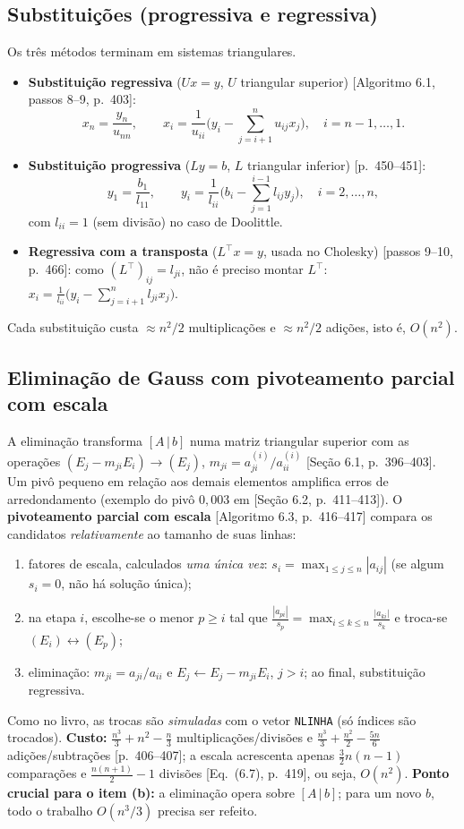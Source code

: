 \documentclass{article}
\newcommand{\T}{^{\top}}
\newcommand{\burden}[1]{\textsf{\footnotesize[#1]}}
\theoremstyle{remark}
\begin{document}
\subsection{Substituições (progressiva e regressiva)}
Os três métodos terminam em sistemas triangulares.
\begin{itemize}
\item \textbf{Substituição regressiva} ($Ux=y$, $U$ triangular superior) \burden{Algoritmo 6.1, passos 8--9, p.~403}:
\[
x_n=\frac{y_n}{u_{nn}},\qquad x_i=\frac{1}{u_{ii}}\Big(y_i-\sum_{j=i+1}^{n}u_{ij}x_j\Big),\quad i=n-1,\dots,1.
\]
\item \textbf{Substituição progressiva} ($Ly=b$, $L$ triangular inferior) \burden{p.~450--451}:
\[
y_1=\frac{b_1}{l_{11}},\qquad y_i=\frac{1}{l_{ii}}\Big(b_i-\sum_{j=1}^{i-1}l_{ij}y_j\Big),\quad i=2,\dots,n,
\]
com $l_{ii}=1$ (sem divisão) no caso de Doolittle.
\item \textbf{Regressiva com a transposta} ($L\T x=y$, usada no Cholesky) \burden{passos 9--10, p.~466}: como
$(L\T)_{ij}=l_{ji}$, não é preciso montar $L\T$:
\(
x_i=\frac{1}{l_{ii}}\big(y_i-\sum_{j=i+1}^{n}l_{ji}x_j\big).
\)
\end{itemize}
Cada substituição custa $\approx n^2/2$ multiplicações e $\approx n^2/2$ adições, isto é, $O(n^2)$.

\subsection{Eliminação de Gauss com pivoteamento parcial com escala}
A eliminação transforma $[A\,|\,b]$ numa matriz triangular superior com as operações
$(E_j-m_{ji}E_i)\to(E_j)$, $m_{ji}=a^{(i)}_{ji}/a^{(i)}_{ii}$ \burden{Seção 6.1, p.~396--403}.
Um pivô pequeno em relação aos demais elementos amplifica erros de arredondamento
(exemplo do pivô $0{,}003$ em \burden{Seção 6.2, p.~411--413}). O \textbf{pivoteamento parcial com escala}
\burden{Algoritmo 6.3, p.~416--417} compara os candidatos \emph{relativamente} ao tamanho de suas linhas:
\begin{enumerate}
\item fatores de escala, calculados \emph{uma única vez}: $s_i=\max_{1\le j\le n}|a_{ij}|$ (se algum $s_i=0$, não há solução única);
\item na etapa $i$, escolhe-se o menor $p\ge i$ tal que
\(\displaystyle \frac{|a_{pi}|}{s_p}=\max_{i\le k\le n}\frac{|a_{ki}|}{s_k}\)
e troca-se $(E_i)\leftrightarrow(E_p)$;
\item eliminação: $m_{ji}=a_{ji}/a_{ii}$ e $E_j\gets E_j-m_{ji}E_i$, $j>i$; ao final, substituição regressiva.
\end{enumerate}
Como no livro, as trocas são \emph{simuladas} com o vetor \texttt{NLINHA} (só índices são trocados).
\textbf{Custo:} $\frac{n^3}{3}+n^2-\frac n3$ multiplicações/divisões e $\frac{n^3}{3}+\frac{n^2}{2}-\frac{5n}{6}$
adições/subtrações \burden{p.~406--407}; a escala acrescenta apenas $\frac32n(n-1)$ comparações e
$\frac{n(n+1)}{2}-1$ divisões \burden{Eq.~(6.7), p.~419}, ou seja, $O(n^2)$.
\textbf{Ponto crucial para o item (b):} a eliminação opera sobre $[A\,|\,b]$; para um novo $b$, todo o trabalho
$O(n^3/3)$ precisa ser refeito.
\end{document}
